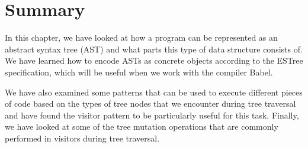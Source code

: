 \section{Summary}
In this chapter,
we have looked at how a program can
be represented as an abstract syntax tree (AST)
and what parts this type of data structure consists of.
We have learned how to encode ASTs as concrete objects
according to the ESTree specification,
which will be useful when we work with the compiler Babel.

We have also examined some patterns
that can be used to execute different pieces of code
based on the types of tree nodes
that we encounter during tree traversal
and have found the visitor pattern
to be particularly useful for this task.
Finally, we have looked at some of
the tree mutation operations
that are commonly performed
in visitors during tree traversal.
